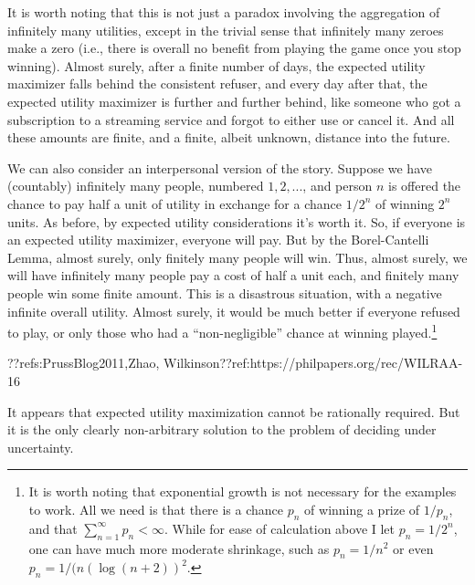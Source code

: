 It is worth noting that this is not just a paradox involving the aggregation of infinitely many utilities, except in the trivial
sense that infinitely many zeroes make a zero (i.e., there is overall no benefit from playing the game once you stop winning). 
Almost surely, after a finite number of days, the expected utility maximizer
falls behind the consistent refuser, and every day after that, the expected utility maximizer is further and further behind,
like someone who got a subscription to a streaming service and forgot to either use or cancel it. And all these amounts are 
finite, and a finite, albeit unknown, distance into the future.

We can also consider an interpersonal version of the story. Suppose we have (countably) infinitely many people, numbered $1,2,...$, and person $n$ 
is offered the chance to pay half a unit of utility in exchange for a chance $1/2^n$ of winning $2^n$ units. As before, by expected utility
considerations it's worth it. So, if everyone is an expected utility maximizer, everyone will pay. But by the Borel-Cantelli Lemma, 
almost surely, only finitely many people will win. Thus, almost surely, we will have infinitely many people
pay a cost of half a unit each, and finitely many people win some finite amount. This is a disastrous situation, with a negative infinite
overall utility. Almost surely, it would be much better if everyone refused to play, or only those who had a ``non-negligible'' chance 
at winning played.\footnote{It is worth noting that exponential growth is not necessary for the examples to work. All we need is that
there is a chance $p_n$ of winning a prize of $1/p_n$, and that $\sum_{n=1}^\infty p_n < \infty$. While for ease of calculation above
I let $p_n=1/2^n$, one can have much more moderate shrinkage, such as $p_n=1/n^2$ or even $p_n=1/(n(\log (n+2))^2$.}

??refs:PrussBlog2011,Zhao, 
Wilkinson??ref:https://philpapers.org/rec/WILRAA-16

It appears that expected utility maximization cannot be rationally required. But it is the only clearly non-arbitrary solution
to the problem of deciding under uncertainty.

